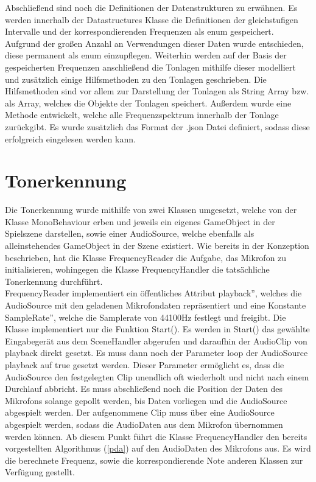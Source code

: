 Abschließend sind noch die Definitionen der Datenstrukturen zu erwähnen. Es werden innerhalb der Datastructures Klasse die Definitionen der gleichstufigen Intervalle und der korrespondierenden Frequenzen als enum gespeichert. Aufgrund der großen Anzahl an Verwendungen dieser Daten wurde entschieden, diese permanent als enum einzupflegen. Weiterhin werden auf der Basis der gespeicherten Frequenzen anschließend die Tonlagen mithilfe dieser modelliert und zusätzlich einige Hilfsmethoden zu den Tonlagen geschrieben. Die Hilfsmethoden sind vor allem zur Darstellung der Tonlagen als String Array bzw. als Array, welches die Objekte der Tonlagen speichert. Außerdem wurde eine Methode entwickelt, welche alle Frequenzspektrum innerhalb der Tonlage zurückgibt. Es wurde zusätzlich das Format der .json Datei definiert, sodass diese erfolgreich eingelesen werden kann. 

\section{Tonerkennung}
\label{sec:tonerkennung}
Die Tonerkennung wurde mithilfe von zwei Klassen umgesetzt, welche von der Klasse MonoBehaviour erben und jeweils ein eigenes GameObject in der Spielszene darstellen, sowie einer AudioSource, welche ebenfalls als alleinstehendes GameObject in der Szene existiert. Wie bereits in der Konzeption beschrieben, hat die Klasse FrequencyReader die Aufgabe, das Mikrofon zu initialisieren, wohingegen die Klasse FrequencyHandler die tatsächliche Tonerkennung durchführt. \\
FrequencyReader implementiert ein öffentliches Attribut \glqq playback'', welches die AudioSource mit den geladenen Mikrofondaten repräsentiert und eine Konstante \glqq SampleRate'', welche die Samplerate von 44100Hz festlegt und freigibt. Die Klasse implementiert nur die Funktion Start(). Es werden in Start() das gewählte Eingabegerät aus dem SceneHandler abgerufen und daraufhin der AudioClip von playback direkt gesetzt. Es muss dann noch der Parameter loop der AudioSource playback auf true gesetzt werden. Dieser Parameter ermöglicht es, dass die AudioSource den festgelegten Clip unendlich oft wiederholt und nicht nach einem Durchlauf abbricht. Es muss abschließend noch die Position der Daten des Mikrofons solange gepollt werden, bis Daten vorliegen und die AudioSource abgespielt werden. Der aufgenommene Clip muss über eine AudioSource abgespielt werden, sodass die AudioDaten aus dem Mikrofon übernommen werden können. Ab diesem Punkt führt die Klasse FrequencyHandler den bereits vorgestellten Algorithmus (\ref{pda}) auf den AudioDaten des Mikrofons aus. Es wird die berechnete Frequenz, sowie die korrespondierende Note anderen Klassen zur Verfügung gestellt. 

